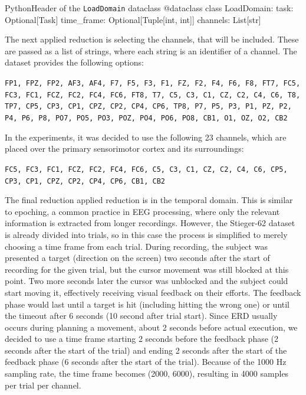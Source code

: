 \documentclass[english, he, bc, kiv, iso690alph]{fasthesis}
\begin{document}
\begin{code}{Python}{Header of the \texttt{LoadDomain} dataclass}
	@dataclass
	class LoadDomain:
	task: Optional[Task]
	time_frame: Optional[Tuple[int, int]]
	channels: List[str]
\end{code}

The next applied reduction is selecting the channels, that will be included. These are passed as a list of strings, where each string is an identifier of a channel. The dataset provides the following options:

\texttt{FP1, FPZ, FP2, AF3, AF4, F7, F5, F3, F1, FZ, F2, F4, F6, F8, FT7, FC5, FC3, FC1, FCZ, FC2, FC4, FC6, FT8, T7, C5, C3, C1, CZ, C2, C4, C6, T8, TP7, CP5, CP3, CP1, CPZ, CP2, CP4, CP6, TP8, P7, P5, P3, P1, PZ, P2, P4, P6, P8, PO7, PO5, PO3, POZ, PO4, PO6, PO8, CB1, O1, OZ, O2, CB2}

In the experiments, it was decided to use the following 23 channels, which are placed over the primary sensorimotor cortex and its surroundings:

\texttt{FC5, FC3, FC1, FCZ, FC2, FC4, FC6, C5, C3, C1, CZ, C2, C4, C6, CP5, CP3, CP1, CPZ, CP2, CP4, CP6, CB1, CB2}

The final reduction applied reduction is in the temporal domain. This is similar to epoching, a common practice in EEG processing, where only the relevant information is extracted from longer recordings. However, the Stieger-62 dataset is already divided into trials, so in this case the process is simplified to merely choosing a time frame from each trial. During recording, the subject was presented a target (direction on the screen) two seconds after the start of recording for the given trial, but the cursor movement was still blocked at this point. Two more seconds later the cursor was unblocked and the subject could start moving it, effectively receiving visual feedback on their efforts. The feedback phase would last until a target is hit (including hitting the wrong one) or until the timeout after 6 seconds (10 second after trial start). Since ERD usually occurs during planning a movement, about 2 seconds before actual execution, we decided to use a time frame starting 2 seconds before the feedback phase (2 seconds after the start of the trial) and ending 2 seconds after the start of the feedback phase (6 seconds after the start of the trial). Because of the 1000 Hz sampling rate, the time frame becomes (2000, 6000), resulting in 4000 samples per trial per channel.

\end{document}
